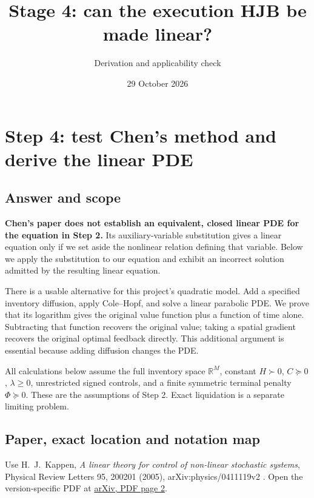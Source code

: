 \documentclass[11pt,a4paper]{article}
\title{Stage 4: can the execution HJB be made linear?}
\author{Derivation and applicability check}
\date{29 October 2026}
\begin{document}
\maketitle
\setcounter{section}{3}
\section{Step 4: test Chen's method and derive the linear PDE}
\label{sec:stage4}

\subsection*{Answer and scope}

\textbf{Chen's paper does not establish an equivalent, closed linear PDE
for the equation in Step 2.} Its auxiliary-variable substitution gives a
linear equation only if we set aside the nonlinear relation defining that
variable. Below we apply the substitution to our equation and exhibit an
incorrect solution admitted by the resulting linear equation.

There is a usable alternative for this project's quadratic model. Add a
specified inventory diffusion, apply Cole--Hopf, and solve a linear
parabolic PDE. We prove that its logarithm gives the original value
function plus a function of time alone. Subtracting that function recovers
the original value; taking a spatial gradient recovers the original
optimal feedback directly. This additional argument is essential because
adding diffusion changes the PDE.

All calculations below assume the full inventory space $\mathbb R^M$,
constant $H\succ0$, $C\succeq0$, $\lambda\ge0$, unrestricted signed
controls, and a finite symmetric terminal penalty $\Phi\succeq0$.
These are the assumptions of Step 2. Exact liquidation is a separate
limiting problem.

\subsection*{Paper, exact location and notation map}

Use H.~J.~Kappen, \emph{A linear theory for control of non-linear
stochastic systems}, Physical Review Letters 95, 200201 (2005),
arXiv:physics/0411119v2 \cite{kappen2005}.
Open the version-specific PDF at
\href{https://arxiv.org/pdf/physics/0411119v2#page=2}{arXiv, PDF page 2}.
\end{document}
